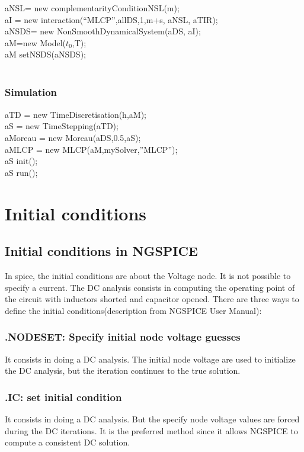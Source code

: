  aNSL= new complementarityConditionNSL(m);\\
 aI = new interaction(``MLCP'',allDS,1,m+s, aNSL, aTIR);\\
 aNSDS= new NonSmoothDynamicalSystem(aDS, aI);\\
 aM=new Model($t_{0}$,T);\\
 aM setNSDS(aNSDS);\\
\\
\subsubsection{Simulation}
aTD = new TimeDiscretisation(h,aM);\\
aS = new TimeStepping(aTD);\\
aMoreau = new Moreau(aDS,0.5,aS);\\
aMLCP = new MLCP(aM,mySolver,''MLCP'');\\
aS init();\\
aS run();\\
\newpage

\section{Initial conditions}
\subsection{Initial conditions in NGSPICE}
In spice, the initial conditions are about the Voltage node. It is not possible to specify a
current. The DC analysis consists in computing the operating point of the circuit with inductors
shorted and capacitor opened. There are three ways to define the initial conditions(description from NGSPICE User Manual):

\subsubsection{.NODESET: Specify initial node voltage guesses}
It consists in doing a DC analysis. The initial node voltage are used to initialize the DC analysis,
but the iteration continues to the true solution.
\subsubsection{.IC: set initial condition }
It consists in doing a DC analysis. But the specify node voltage values are forced during the DC
iterations. It is the preferred method since it allows NGSPICE to compute a consistent DC solution.
